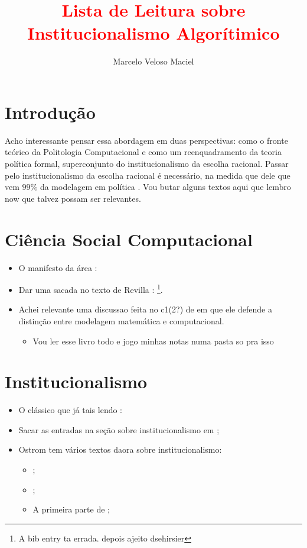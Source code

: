 \documentclass{article}
\title{\textcolor{red}{Lista de Leitura sobre Institucionalismo Algorítimico}}
\author{Marcelo Veloso Maciel } \date{}
\begin{document}
\pagecolor{base03}
\color{base1}
\maketitle



\section{Introdução}



Acho interessante pensar essa abordagem em duas perspectivas: como o fronte
teórico da Politologia Computacional e como um reenquadramento da teoria
política formal, superconjunto do institucionalismo da escolha racional. Passar
pelo institucionalismo da escolha racional é necessário, na medida que dele que
vem \(99 \% \) da modelagem em política \cite{austen1998social}. Vou butar
alguns textos aqui que lembro now que talvez possam ser relevantes. 


\section{Ciência Social Computacional}

\begin{itemize}
\item O manifesto da área : \cite{conte2012manifesto}
\item Dar uma sacada no texto de Revilla :
  \textcite{cioffi2014introduction}\footnote{A bib entry ta errada. depois ajeito
    dsehirsier}.
\item Achei relevante uma discussao feita no c1(2?) de
  \textcite{weisberg2012simulation} em que ele defende a distinção entre
  modelagem matemática e computacional.
  \begin{itemize}
  \item Vou ler esse livro todo e jogo minhas notas numa pasta so pra isso
  \end{itemize}
\end{itemize}


\section{Institucionalismo}

\begin{itemize}
\item O clássico que já tais lendo : \textcite{hall1996political}
\item Sacar as entradas na seção sobre institucionalismo em
  \textcite{goodin2009oxford};
\item Ostrom tem vários textos daora sobre institucionalismo:
  \begin{itemize}
  \item \textcite{ostrom1986agenda};
  \item \textcite{crawford1995grammar}; 
  \item A primeira parte de \textcite{ostrom2005understanding};
  \end{itemize}
\end{itemize}
\end{document}

